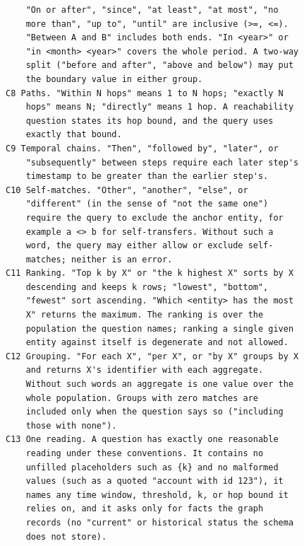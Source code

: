 \begin{verbatim}
    "On or after", "since", "at least", "at most", "no
    more than", "up to", "until" are inclusive (>=, <=).
    "Between A and B" includes both ends. "In <year>" or
    "in <month> <year>" covers the whole period. A two-way
    split ("before and after", "above and below") may put
    the boundary value in either group.
C8 Paths. "Within N hops" means 1 to N hops; "exactly N
    hops" means N; "directly" means 1 hop. A reachability
    question states its hop bound, and the query uses
    exactly that bound.
C9 Temporal chains. "Then", "followed by", "later", or
    "subsequently" between steps require each later step's
    timestamp to be greater than the earlier step's.
C10 Self-matches. "Other", "another", "else", or
    "different" (in the sense of "not the same one")
    require the query to exclude the anchor entity, for
    example a <> b for self-transfers. Without such a
    word, the query may either allow or exclude self-
    matches; neither is an error.
C11 Ranking. "Top k by X" or "the k highest X" sorts by X
    descending and keeps k rows; "lowest", "bottom",
    "fewest" sort ascending. "Which <entity> has the most
    X" returns the maximum. The ranking is over the
    population the question names; ranking a single given
    entity against itself is degenerate and not allowed.
C12 Grouping. "For each X", "per X", or "by X" groups by X
    and returns X's identifier with each aggregate.
    Without such words an aggregate is one value over the
    whole population. Groups with zero matches are
    included only when the question says so ("including
    those with none").
C13 One reading. A question has exactly one reasonable
    reading under these conventions. It contains no
    unfilled placeholders such as {k} and no malformed
    values (such as a quoted "account with id 123"), it
    names any time window, threshold, k, or hop bound it
    relies on, and it asks only for facts the graph
    records (no "current" or historical status the schema
    does not store).
\end{verbatim}
\endgroup

